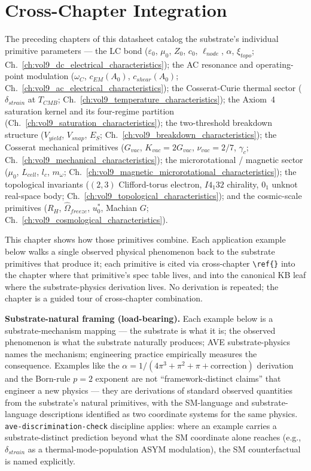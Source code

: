 \section{Cross-Chapter Integration}
\label{sec:vol9_app_cross_chapter_integration}

The preceding chapters of this datasheet catalog the substrate's individual primitive parameters --- the LC bond ($\varepsilon_0$, $\mu_0$, $Z_0$, $c_0$, $\ell_{node}$, $\alpha$, $\xi_{topo}$; Ch.~\ref{ch:vol9_dc_electrical_characteristics}); the AC resonance and operating-point modulation ($\omega_C$, $c_{EM}(A_0)$, $c_{shear}(A_0)$; Ch.~\ref{ch:vol9_ac_electrical_characteristics}); the Cosserat-Curie thermal sector ($\delta_{strain}$ at $T_{CMB}$; Ch.~\ref{ch:vol9_temperature_characteristics}); the Axiom~4 saturation kernel and its four-regime partition (Ch.~\ref{ch:vol9_saturation_characteristics}); the two-threshold breakdown structure ($V_{yield}$, $V_{snap}$, $E_S$; Ch.~\ref{ch:vol9_breakdown_characteristics}); the Cosserat mechanical primitives ($G_{vac}$, $K_{vac} = 2 G_{vac}$, $\nu_{vac} = 2/7$, $\gamma_c$; Ch.~\ref{ch:vol9_mechanical_characteristics}); the microrotational / magnetic sector ($\mu_0$, $L_{cell}$, $l_c$, $m_\omega$; Ch.~\ref{ch:vol9_magnetic_microrotational_characteristics}); the topological invariants ($(2,3)$ Clifford-torus electron, $I4_1 32$ chirality, $0_1$ unknot real-space body; Ch.~\ref{ch:vol9_topological_characteristics}); and the cosmic-scale primitives ($R_H$, $\hat{\Omega}_{freeze}$, $u_0^*$, Machian $G$; Ch.~\ref{ch:vol9_cosmological_characteristics}).

This chapter shows how those primitives combine. Each application example below walks a single observed physical phenomenon back to the substrate primitives that produce it; each primitive is cited via cross-chapter \texttt{\textbackslash ref\{\}} into the chapter where that primitive's spec table lives, and into the canonical KB leaf where the substrate-physics derivation lives. No derivation is repeated; the chapter is a guided tour of cross-chapter combination.

\textbf{Substrate-natural framing (load-bearing).} Each example below is a substrate-mechanism mapping --- the substrate is what it is; the observed phenomenon is what the substrate naturally produces; AVE substrate-physics names the mechanism; engineering practice empirically measures the consequence. Examples like the $\alpha = 1/(4\pi^3 + \pi^2 + \pi + \text{correction})$ derivation and the Born-rule $p = 2$ exponent are not ``framework-distinct claims'' that engineer a new physics --- they are derivations of standard observed quantities from the substrate's natural primitives, with the SM-language and substrate-language descriptions identified as two coordinate systems for the same physics. \texttt{ave-discrimination-check} discipline applies: where an example carries a substrate-distinct prediction beyond what the SM coordinate alone reaches (e.g., $\delta_{strain}$ as a thermal-mode-population ASYM modulation), the SM counterfactual is named explicitly.

